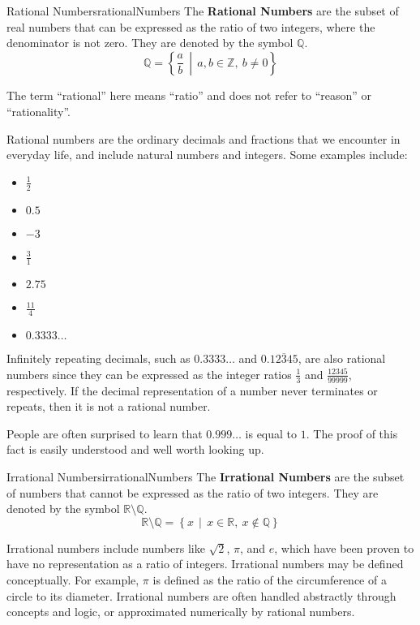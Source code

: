 \begin{definition}{Rational Numbers}{rationalNumbers}
  The \textbf{Rational Numbers} are the subset of real numbers that can be expressed as the
  ratio of two integers, where the denominator is not zero. They are denoted by
  the symbol \(\mathbb{Q}\).
  \[
    \mathbb{Q} = \left\{ \frac{a}{b} \,\middle|\, a, b \in \mathbb{Z},\ b \ne 0 \right\}
  \]

  The term ``rational'' here means ``ratio'' and does not refer to ``reason'' or ``rationality''.
\end{definition}

Rational numbers are the ordinary decimals and fractions that we encounter in everyday life, and include
natural numbers and integers. Some examples include:
\begin{itemize}
\item \(\frac{1}{2}\)
\item \(0.5\)
\item \(-3\)
\item \(\frac{3}{1}\)
\item \(2.75\)
\item \(\frac{11}{4}\)
\item \(0.3333\ldots\)
\end{itemize}

Infinitely repeating decimals, such as \(0.3333\ldots\) and \(0.\overline{12345}\), are also rational
numbers since they can be expressed as the integer ratios \(\frac{1}{3}\) and \(\frac{12345}{99999}\),
respectively. If the decimal representation of a number never terminates or repeats, then it is
not a rational number.

\begin{advancedTopic}
  People are often surprised to learn that \( 0.999\ldots \) is equal to \( 1 \). The proof of this
  fact is easily understood and well worth looking up.
\end{advancedTopic}

\begin{definition}{Irrational Numbers}{irrationalNumbers}
  The \textbf{Irrational Numbers} are the subset of numbers that cannot be expressed
  as the ratio of two integers. They are denoted by the symbol \(\mathbb{R} \setminus \mathbb{Q}\).
  \[
    \mathbb{R} \setminus \mathbb{Q} = \left\{ x \,\middle|\, x \in \mathbb{R},\ x \notin \mathbb{Q} \right\}
  \]
\end{definition}

Irrational numbers include numbers like \(\sqrt{2}\), \(\pi\), and \( e \), which have been proven to
have no representation as a ratio of integers. Irrational numbers may be defined conceptually. For
example, \(\pi\) is defined as the ratio of the circumference of a circle to its diameter. Irrational
numbers are often handled abstractly through concepts and logic, or approximated numerically by rational numbers.

